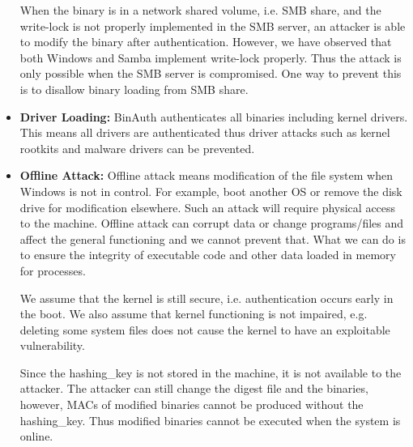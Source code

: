 \begin{itemize}
When the binary is in a network shared volume, i.e. SMB share,
and the write-lock is not properly implemented in the SMB server,
an attacker is able to modify the binary after authentication.
However, we have observed that both Windows and Samba
implement write-lock properly.
Thus the attack is only possible when the SMB server is compromised.
One way to prevent this is to disallow binary loading from SMB share.

\item {\bf Driver Loading:}
BinAuth authenticates all binaries including kernel drivers.
This means all drivers are authenticated thus driver attacks such as
kernel rootkits and malware drivers can be prevented.

\item {\bf Offline Attack:}
Offline attack means modification of the file system when Windows is
not in control.
For example, boot another OS or remove the disk drive for
modification elsewhere. Such an attack will require physical access
to the machine. Offline attack can corrupt data or change programs/files
and affect the general functioning and we cannot prevent that.
What we can do is to ensure the integrity of executable code and other data
loaded in memory for processes.

We assume that the kernel is still secure, i.e. authentication occurs early
in the boot.
We also assume that kernel functioning is not impaired, e.g. deleting some
system files does not cause the kernel to have an exploitable vulnerability.

Since the hashing\_key is not stored in the machine, it is not available
to the attacker.
The attacker can still change the digest file and the binaries,
however, MACs of modified binaries cannot be produced without the hashing\_key.
Thus modified binaries cannot be executed when the system is online.
\end{itemize}
